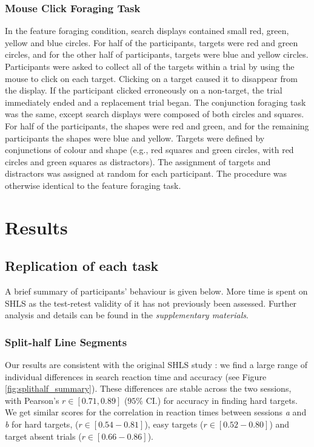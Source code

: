 \documentclass[Afour, sageapa, times]{sagej}
\begin{document}
\subsubsection{Mouse Click Foraging Task}

In the feature foraging condition, search displays contained small red, green, yellow and blue circles. For half of the participants, targets were red and green circles, and for the other half of participants, targets were blue and yellow circles. Participants were asked to collect all of the targets within a trial by using the mouse to click on each target. Clicking on a target caused it to disappear from the display. If the participant clicked erroneously on a non-target, the trial immediately ended and a replacement trial began. The conjunction foraging task was the same, except search displays were composed of both circles and squares. For half of the participants, the shapes were red and green, and for the remaining participants the shapes were blue and yellow. Targets were defined by conjunctions of colour and shape (e.g., red squares and green circles, with red circles and green squares as distractors). The assignment of targets and distractors was assigned at random for each participant. The procedure was otherwise identical to the feature foraging task. 

\section{Results}

\subsection{Replication of each task}

A brief summary of participants' behaviour is given below. More time is spent on SHLS as the test-retest validity of it has not previously been assessed. Further analysis and details can be found in the \textit{supplementary materials}.

\subsubsection{Split-half Line Segments}

Our results are consistent with the original SHLS study \cite{nowakowska2017}: we find a large range of individual differences in search reaction time and accuracy (see Figure \ref{fig:splithalf_summary}). These differences are stable across the two sessions, with Pearson's $r \in [0.71, 0.89]$ ($95\%$ CI.) for accuracy in finding hard targets. We get similar scores for the correlation in reaction times between sessions \textit{a} and \textit{b} for hard targets, ($r \in [0.54-0.81]$), easy targets ($r \in [0.52-0.80]$) and target absent trials ($r \in [0.66-0.86]$). 
\end{document}
